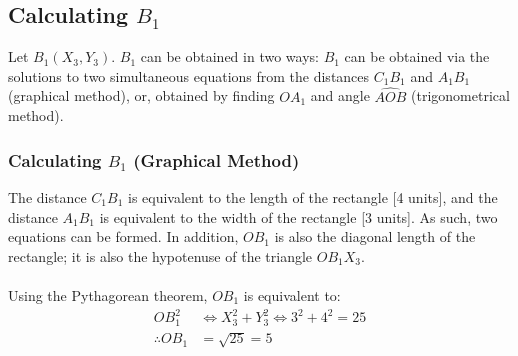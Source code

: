 \documentclass{article}
\begin{document}
        \subsection{Calculating $B_1$} Let $B_1(X_3, Y_3)$. $B_1$ can be obtained in two ways: $B_1$ can be obtained via the solutions to two simultaneous equations from the distances $C_1B_1$ and $A_1B_1$ (graphical method), or, obtained by finding $OA_1$ and angle $\widehat{AOB}$ (trigonometrical method).
        \subsubsection{Calculating $B_1$ (Graphical Method)} The distance $C_1B_1$ is equivalent to the length of the rectangle [4 units], and the distance $A_1B_1$ is equivalent to the width of the rectangle [3 units]. As such, two equations can be formed. In addition, $OB_1$ is also the diagonal length of the rectangle; it is also the hypotenuse of the triangle $OB_1X_3$. \\\\
        Using the Pythagorean theorem, $OB_1$ is equivalent to:
        \begin{align*}
            OB_1^2 &\Leftrightarrow X_3^2 + Y_3^2 \Leftrightarrow 3^2 + 4^2 = 25 \\
            \therefore OB_1 &= \sqrt{25} = 5
        \end{align*}
\end{document}
